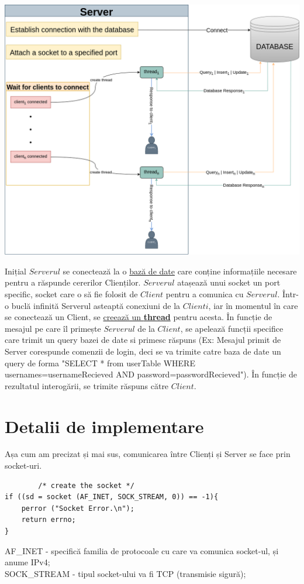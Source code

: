 \documentclass[runningheads]{llncs}
\begin{document}
\begin{center}
\includegraphics[scale=0.4]{diagram_server.png}
\label{sec:server}
\end{center}
Inițial $Serverul$ se conectează la o \hyperref[sec:ServerDataBase]{bază de date} care conține informațiile necesare pentru a răspunde cererilor Clienților.
$Serverul$ atașează unui socket un port specific, socket care o să fie folosit de $Client$ pentru a comunica cu $Serverul$. 
Într-o buclă infinită Serverul asteaptă conexiuni de la $Clienti$, iar în momentul în care se conectează un Client, se \hyperlink{sec:ServerCreateThread}{creează un \textbf{thread}} pentru acesta.
În funcție de mesajul pe care îl primește $Serverul$ de la $Client$, se apelează funcții specifice care trimit un query bazei de date si primesc răspuns
(Ex: Mesajul primit de Server corespunde comenzii de login, deci se va trimite catre baza de date un query de forma 
"SELECT * from userTable WHERE usernames=usernameRecieved AND password=passwordRecieved").
În funcție de rezultatul interogării, se trimite răspuns către $Client$.

\section{Detalii de implementare}
Așa cum am precizat și mai sus, comunicarea între Clienți și Server se face prin socket-uri.
\begin{verbatim}
		/* create the socket */
if ((sd = socket (AF_INET, SOCK_STREAM, 0)) == -1){
    perror ("Socket Error.\n");
    return errno;
}
\end{verbatim} 
AF\_INET - specifică familia de protocoale cu care va comunica socket-ul, și anume IPv4;\\
SOCK\_STREAM - tipul socket-ului va fi TCP (transmisie sigură);\\
\end{document}
